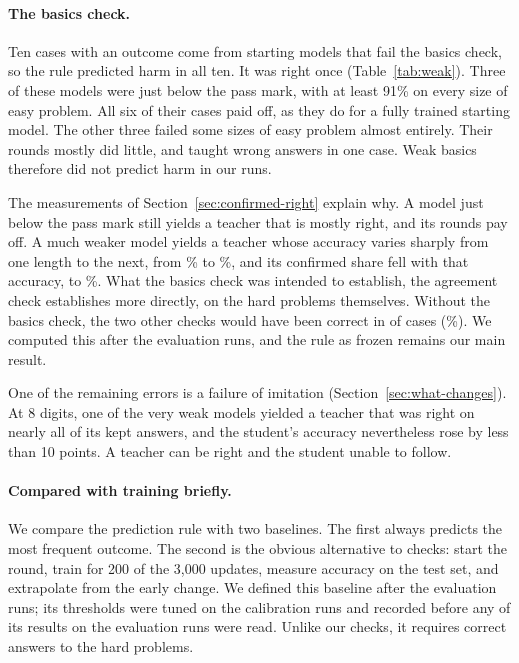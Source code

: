 \paragraph{The basics check.} Ten cases with an outcome come from starting
models that fail the basics check, so the rule predicted harm in all ten. It
was right once (Table~\ref{tab:weak}). Three of
these models were just below the pass mark, with at least 91\% on every size
of easy problem. All six of their cases paid off, as they do for a fully
trained starting model. The other three failed some sizes of easy problem
almost entirely. Their rounds mostly did little, and taught wrong answers in
one case. Weak basics therefore did not predict harm in our runs.

The measurements of Section~\ref{sec:confirmed-right} explain why. A model
just below the pass mark still yields a teacher that is mostly right, and its
rounds pay off. A much weaker model yields a teacher whose accuracy varies
sharply from one length to the next, from \gpTaWeakAccLow\% to
\gpTaWeakAccHigh\%, and its confirmed share fell with that accuracy, to
\gpTaWeakConfirmedLow\%. What the basics check was intended to establish, the
agreement check establishes more directly, on the hard problems themselves.
Without the basics check, the two other checks would have been correct in
\gpCorrectNoBasics{} of \gpCases{} cases (\gpCorrectNoBasicsPct\%). We
computed this after the evaluation runs, and the rule as frozen remains our
main result.

One of the remaining errors is a failure of imitation
(Section~\ref{sec:what-changes}). At 8 digits, one of the very weak models
yielded a teacher that was right on nearly all of its kept answers, and the
student's accuracy nevertheless rose by less than 10 points. A teacher can be
right and the student unable to follow.




\paragraph{Compared with training briefly.}
\label{sec:vs-baseline}
\label{sec:baselines}
We compare the prediction rule with two baselines. The first always predicts
the most frequent outcome. The second is the obvious alternative to checks:
start the round, train for 200 of the 3,000 updates, measure accuracy on the
test set, and extrapolate from the early change. We defined this baseline
after the evaluation runs; its thresholds were tuned on the calibration runs
and recorded before any of its results on the evaluation runs were read.
Unlike our checks, it requires correct answers to the hard problems.

